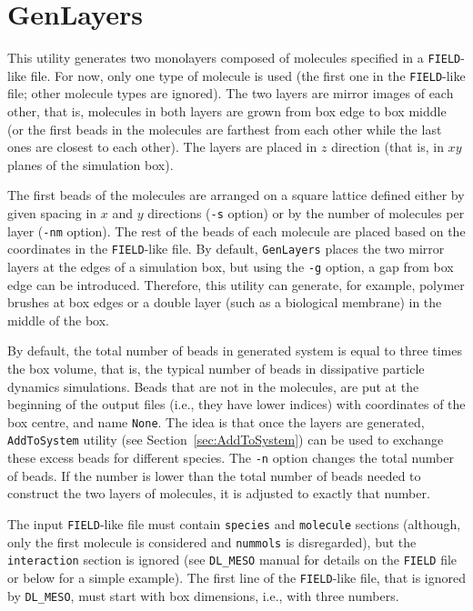 \section{GenLayers} \label{sec:GenLayers}

This utility generates two monolayers composed of molecules specified in a
\texttt{FIELD}-like file. For now, only one type of molecule is used (the
first one in the \texttt{FIELD}-like file; other molecule types are
ignored). The two layers are mirror images of each other, that is,
molecules in both layers are grown from box edge to box middle (or the
first beads in the molecules are farthest from each other while the last
ones are closest to each other). The layers are placed in $z$ direction
(that is, in $xy$ planes of the simulation box).

The first beads of the molecules are arranged on a square lattice defined
either by given spacing in $x$ and $y$ directions (\texttt{-s} option) or
by the number of molecules per layer (\texttt{-nm} option). The rest of the
beads of each molecule are placed based on the coordinates in the
\texttt{FIELD}-like file. By default, \texttt{GenLayers} places the two
mirror layers at the edges of a simulation box, but using the \texttt{-g}
option, a gap from box edge can be introduced. Therefore, this utility
can generate, for example, polymer brushes at box edges or a double layer
(such as a biological membrane) in the middle of the box.

By default, the total number of beads in generated system is equal to three
times the box volume, that is, the typical number of beads in dissipative
particle dynamics simulations. Beads that are not in the molecules, are put
at the beginning of the output files (i.e., they have lower indices) with
coordinates of the box centre, and name \texttt{None}. The idea is that
once the layers are generated, \texttt{AddToSystem} utility (see
Section~\ref{sec:AddToSystem}) can be used to exchange these excess beads
for different species. The \texttt{-n} option changes the total number of
beads. If the number is lower than the total number of beads needed to
construct the two layers of molecules, it is adjusted to exactly that
number.

The input \texttt{FIELD}-like file must contain \texttt{species} and
\texttt{molecule} sections (although, only the first molecule is considered
and \texttt{nummols} is disregarded), but the \texttt{interaction} section
is ignored (see \texttt{DL\_MESO} manual for details on the \texttt{FIELD}
file or below for a simple example). The first line of the
\texttt{FIELD}-like file, that is ignored by \texttt{DL\_MESO}, must start
with box dimensions, i.e., with three numbers.

